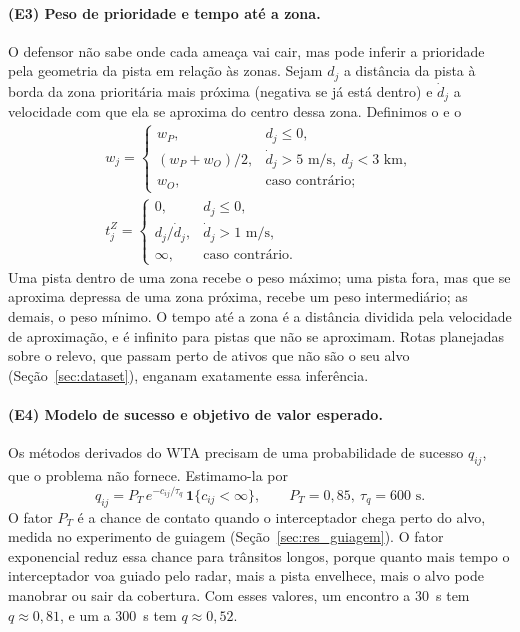 \paragraph{(E3) Peso de prioridade e tempo até a zona.} O defensor não sabe onde cada ameaça vai cair, mas pode inferir
a prioridade pela geometria da pista em relação às zonas. Sejam $d_j$ a distância da pista à borda da zona prioritária
mais próxima (negativa se já está dentro) e $\dot d_j$ a velocidade com que ela se aproxima do centro dessa zona. Definimos
o  e o 
\begin{equation}
  \begin{gathered}
  w_j=\begin{cases} w_P, & d_j\le 0,\\ (w_P+w_O)/2, & \dot d_j>5\text{ m/s},\ d_j<3\text{ km},\\ w_O, & \text{caso contrário;}\end{cases}\\[4pt]
  t^Z_j=\begin{cases}0, & d_j\le0,\\ d_j/\dot d_j, & \dot d_j>1\text{ m/s},\\ \infty,&\text{caso contrário.}\end{cases}
  \end{gathered}
  \label{eq:peso}
\end{equation}
Uma pista dentro de uma zona recebe o peso máximo; uma pista fora, mas que se aproxima depressa de uma zona próxima,
recebe um peso intermediário; as demais, o peso mínimo. O tempo até a zona é a distância dividida pela velocidade de
aproximação, e é infinito para pistas que não se aproximam. Rotas planejadas sobre o relevo, que passam perto de ativos
que não são o seu alvo (Seção~\ref{sec:dataset}), enganam exatamente essa inferência.

\paragraph{(E4) Modelo de sucesso e objetivo de valor esperado.} Os métodos derivados do WTA precisam de uma
probabilidade de sucesso $q_{ij}$, que o problema não fornece. Estimamo-la por
\begin{equation}
  q_{ij} = P_T\,e^{-c_{ij}/\tau_q}\,\mathbf{1}\{c_{ij}<\infty\},\qquad P_T=0{,}85,\ \tau_q=600\text{ s}.
  \label{eq:q}
\end{equation}
O fator $P_T$ é a chance de contato quando o interceptador chega perto do alvo, medida no experimento de guiagem
(Seção~\ref{sec:res_guiagem}). O fator exponencial reduz essa chance para trânsitos longos, porque quanto mais tempo o
interceptador voa guiado pelo radar, mais a pista envelhece, mais o alvo pode manobrar ou sair da cobertura. Com esses
valores, um encontro a 30~s tem $q\approx0{,}81$, e um a 300~s tem $q\approx0{,}52$.

